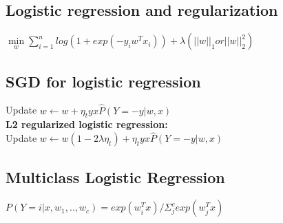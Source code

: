 
\subsection*{Logistic regression and regularization}
$\underset{w}{\operatorname{min}} \sum_{i=1}^n log(1+exp(-y_i w^T x_i)) + 
\lambda (||w||_1 or ||w||_2^2)$

\subsection*{SGD for logistic regression}
\iffalse
1. Initialize w\\
2. For t=1,2,...\\
Pick data $(x,y) \in_{u.a.r} D$\\
Prob. of misclas. $\hat{P}(Y = -y|w,x) = \frac{1}{1+exp(yw^Tx)}$\\
\fi
Update $w \leftarrow w + \eta_t y x \hat{P}(Y = -y|w,x)$\\
\textbf{L2 regularized logistic regression:}\\
Update $w \leftarrow w (1-2\lambda \eta_t) + \eta_t y x \hat{P}(Y = -y|w,x)$

\subsection*{Multiclass Logistic Regression}
$P(Y=i|x,w_1,..,w_c)=exp(w_i^Tx)/\Sigma_j^c exp(w_j^Tx)$
